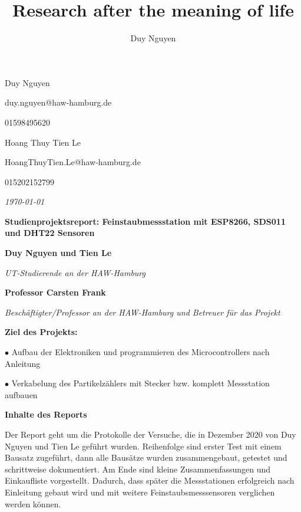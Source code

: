 \documentclass[draft=false
              ,paper=a4
              ,twoside=false
              ,fontsize=10pt
              ,headsepline
              ,BCOR10mm
              ,DIV11
              ]{article}
\title{Research after the meaning of life}
\author{Duy Nguyen}
\begin{document}
\color{smokyblack}

\setlength{\parskip}{1ex}

\small{Duy Nguyen}

\small{duy.nguyen@haw-hamburg.de}

\small{01598495620}

\small{Hoang Thuy Tien Le}

\small{HoangThuyTien.Le@haw-hamburg.de}

\small{015202152799}

\vspace{2cm}

\textsf{\textit{\large{\today}}}

\color{arsenic}
\textsf{\textbf{\Large{Studienprojektsreport: Feinstaubmessstation mit ESP8266, SDS011 und DHT22 Sensoren}}}

\setlength{\parskip}{0.8em}
\color{smokyblack}
\begin{adjustwidth}{3em}{0pt}
\begin{flushleft}
	\textbf{Duy Nguyen und Tien Le}


	\textit{UT-Studierende an der HAW-Hamburg}

  \vspace{6pt}

  \textbf{Professor Carsten Frank}


	\textit{Beschäftigter/Professor an der HAW-Hamburg und Betreuer für das Projekt}


  \vspace{12pt}

  \textbf{Ziel des Projekts:}

  $\bullet$ Aufbau der Elektroniken und programmieren des Microcontrollers nach Anleitung

  $\bullet$ Verkabelung des Partikelzählers mit Stecker bzw. komplett Messstation aufbauen

  \textbf{Inhalte des Reports}

  Der Report geht um die Protokolle der Versuche, die in Dezember 2020 von Duy Nguyen und Tien Le geführt wurden. Reihenfolge sind erster Test mit einem Bausatz zugeführt, dann alle Bausätze wurden zusammengebaut, getestet und schrittweise dokumentiert. Am Ende sind kleine Zusammenfassungen und Einkaufliste vorgestellt. Dadurch, dass später die Messstationen erfolgreich nach Einleitung gebaut wird und mit weitere Feinstaubsmesssensoren verglichen werden können.

\end{flushleft}
\end{adjustwidth}
\end{document}
